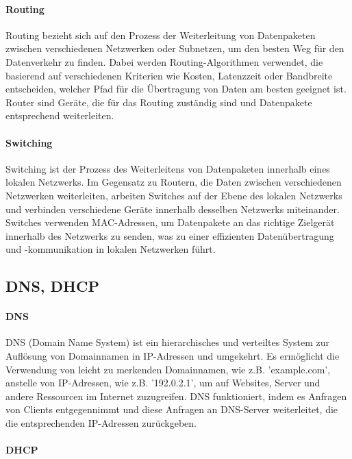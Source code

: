 \paragraph{Routing}

Routing bezieht sich auf den Prozess der Weiterleitung von Datenpaketen zwischen verschiedenen Netzwerken oder Subnetzen, um den besten Weg für den Datenverkehr zu finden. Dabei werden Routing-Algorithmen verwendet, die basierend auf verschiedenen Kriterien wie Kosten, Latenzzeit oder Bandbreite entscheiden, welcher Pfad für die Übertragung von Daten am besten geeignet ist. Router sind Geräte, die für das Routing zuständig sind und Datenpakete entsprechend weiterleiten.

\paragraph{Switching}

Switching ist der Prozess des Weiterleitens von Datenpaketen innerhalb eines lokalen Netzwerks. Im Gegensatz zu Routern, die Daten zwischen verschiedenen Netzwerken weiterleiten, arbeiten Switches auf der Ebene des lokalen Netzwerks und verbinden verschiedene Geräte innerhalb desselben Netzwerks miteinander. Switches verwenden MAC-Adressen, um Datenpakete an das richtige Zielgerät innerhalb des Netzwerks zu senden, was zu einer effizienten Datenübertragung und -kommunikation in lokalen Netzwerken führt.

\subsection{DNS, DHCP}

\paragraph{DNS}

DNS (Domain Name System) ist ein hierarchisches und verteiltes System zur Auflösung von Domainnamen in IP-Adressen und umgekehrt. Es ermöglicht die Verwendung von leicht zu merkenden Domainnamen, wie z.B. 'example.com', anstelle von IP-Adressen, wie z.B. '192.0.2.1', um auf Websites, Server und andere Ressourcen im Internet zuzugreifen. DNS funktioniert, indem es Anfragen von Clients entgegennimmt und diese Anfragen an DNS-Server weiterleitet, die die entsprechenden IP-Adressen zurückgeben.

\paragraph{DHCP}

